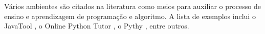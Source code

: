Vários ambientes são citados na literatura como meios para auxiliar o processo de ensino e aprendizagem de programação e algoritmo. A lista de exemplos inclui o JavaTool \cite{mota2008}, o Online Python Tutor \cite{guo2013}, o Pythy \cite{edwardsetall2013}, entre outros. %